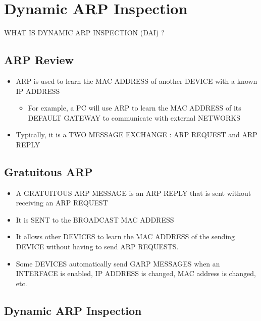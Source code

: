 \chapter{Dynamic ARP Inspection}\label{dynamic-arp-inspection}

WHAT IS DYNAMIC ARP INSPECTION (DAI) ?

\section{ARP Review}\label{arp-review}

\begin{itemize}
\tightlist
\item
  ARP is used to learn the MAC ADDRESS of another DEVICE with a known IP
  ADDRESS

  \begin{itemize}
  \tightlist
  \item
    For example, a PC will use ARP to learn the MAC ADDRESS of its
    DEFAULT GATEWAY to communicate with external NETWORKS
  \end{itemize}
\item
  Typically, it is a TWO MESSAGE EXCHANGE : ARP REQUEST and ARP REPLY
\end{itemize}

\section{Gratuitous ARP}\label{gratuitous-arp}

\begin{itemize}
\tightlist
\item
  A GRATUITOUS ARP MESSAGE is an ARP REPLY that is sent without
  receiving an ARP REQUEST
\item
  It is SENT to the BROADCAST MAC ADDRESS
\item
  It allows other DEVICES to learn the MAC ADDRESS of the sending DEVICE
  without having to send ARP REQUESTS.
\item
  Some DEVICES automatically send GARP MESSAGES when an INTERFACE is
  enabled, IP ADDRESS is changed, MAC address is changed, etc.
\end{itemize}

\section{Dynamic ARP Inspection}\label{dynamic-arp-inspection-1}

